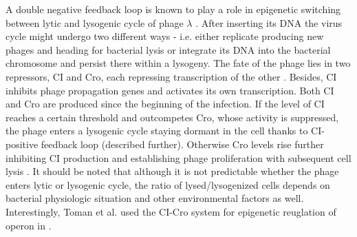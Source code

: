 A double negative feedback loop is known to play a role in epigenetic switching between lytic and lysogenic cycle of  phage $\lambda$ \cite{smits2006phenotypic, casadesus2013programmed}.
After inserting its DNA the virus cycle might undergo two different ways - i.e. either replicate producing new phages and heading for bacterial lysis or integrate its DNA into the bacterial chromosome and persist there within a lysogeny.
The fate of the phage lies in two repressors, CI and Cro, each repressing transcription of the other \cite{eisen1970regulation, neubauer1970immunity}.
Besides, CI inhibits phage propagation genes and activates its own transcription.
Both CI and Cro are produced since the beginning of the infection.
If the level of CI reaches a certain threshold and outcompetes Cro, whose activity is suppressed, the phage enters a lysogenic cycle staying dormant in the cell thanks to CI- positive feedback loop (described further).
Otherwise Cro levels rise further inhibiting CI production and establishing phage proliferation with subsequent cell lysis \cite{svenningsen2005role}.
It should be noted that although it is not predictable whether the phage enters lytic or lysogenic cycle, the ratio of lysed/lysogenized cells depends on bacterial physiologic situation and other environmental factors as well.
Interestingly, Toman et al. used the CI-Cro system for epigenetic reuglation of  operon in  \cite{toman1985system}.



